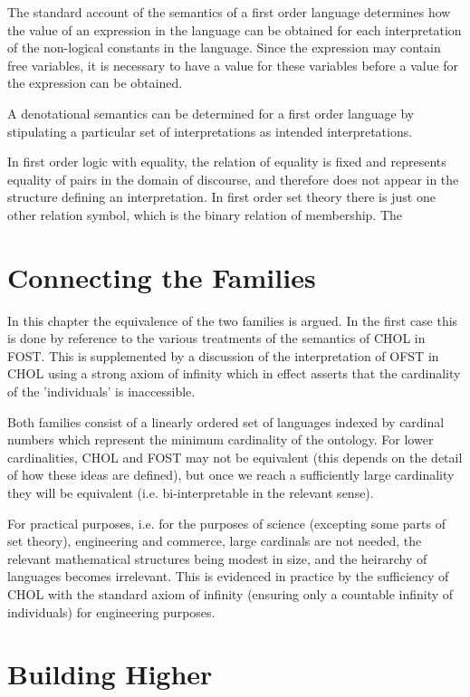 \documentclass[10pt,titlepage]{book}
\begin{document}
The standard account of the semantics of a first order language determines how the value of an expression in the language can be obtained for each interpretation of the non-logical constants in the language.
Since the expression may contain free variables, it is necessary to have a value for these variables before a value for the expression can be obtained.

A denotational semantics can be determined for a first order language by stipulating a particular set of interpretations as intended interpretations.

In first order logic with equality, the relation of equality is fixed and represents equality of pairs in the domain of discourse, and therefore does not appear in the structure defining an interpretation.
In first order set theory there is just one other relation symbol, which is the binary relation of membership.
The 



\chapter{Connecting the Families}

In this chapter the equivalence of the two families is argued.
In the first case this is done by reference to the various treatments of the semantics of CHOL in FOST.
This is supplemented by a discussion of the interpretation of OFST in CHOL using a strong axiom of infinity which in effect asserts that the cardinality of the 'individuals' is inaccessible.

Both families consist of a linearly ordered set of languages indexed by cardinal numbers which represent the minimum cardinality of the ontology.
For lower cardinalities, CHOL and FOST may not be equivalent (this depends on the detail of how these ideas are defined), but once we reach a sufficiently large cardinality they will be equivalent (i.e. bi-interpretable in the relevant sense).

For practical purposes, i.e. for the purposes of science (excepting some parts of set theory), engineering and commerce, large cardinals are not needed, the relevant mathematical structures being modest in size, and the heirarchy of languages becomes irrelevant.
This is evidenced in practice by the sufficiency of CHOL with the standard axiom of infinity (ensuring only a countable infinity of individuals) for engineering purposes.

\chapter{Building Higher}
\end{document}
